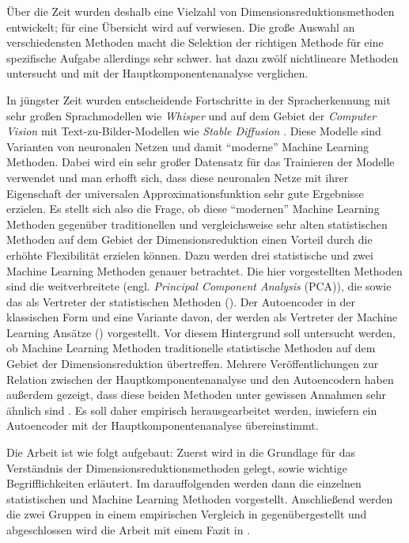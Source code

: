 Über die Zeit wurden deshalb eine Vielzahl von Dimensionsreduktionsmethoden entwickelt; für eine Übersicht wird auf \textcites{Burges.2009}{Sarveniazi.2014}{Sorzano.2014}{Cunningham.2014}{Lee.2007} verwiesen. Die große Auswahl an verschiedensten Methoden macht die Selektion der richtigen Methode für eine spezifische Aufgabe allerdings sehr schwer. \Textcite{vanderMaaten.2009} hat dazu zwölf nichtlineare Methoden untersucht und mit der Hauptkomponentenanalyse verglichen.

In jüngster Zeit wurden entscheidende Fortschritte in der Spracherkennung mit sehr großen
Sprachmodellen wie \textit{Whisper} \parencite{Radford.2022} und auf dem Gebiet der \textit{Computer Vision} mit Text-zu-Bilder-Modellen
wie \textit{Stable Diffusion} \parencite{Rombach.2021}. Diese Modelle sind Varianten von neuronalen Netzen und damit
\enquote{moderne} Machine Learning Methoden. Dabei wird ein sehr großer Datensatz für das
Trainieren der Modelle verwendet und man erhofft sich, dass diese neuronalen Netze mit ihrer
Eigenschaft der universalen Approximationsfunktion \parencites[194 -- 197]{Goodfellow.2016}{Hornik.1989} sehr gute Ergebnisse erzielen. Es stellt sich
also die Frage, ob diese \enquote{modernen} Machine Learning Methoden gegenüber traditionellen und
vergleichsweise sehr alten statistischen Methoden auf dem Gebiet der Dimensionsreduktion einen
Vorteil durch die erhöhte Flexibilität erzielen können. Dazu werden drei statistische und zwei
Machine Learning Methoden genauer betrachtet. Die hier vorgestellten Methoden sind die
weitverbreitete  (engl. \textit{Principal Component Analysis}
(PCA)), die  sowie das  als Vertreter der
statistischen Methoden (). Der Autoencoder in der
klassischen Form und eine Variante davon, der  werden als
Vertreter der Machine Learning Ansätze () vorgestellt. Vor
diesem Hintergrund soll untersucht werden, ob Machine Learning Methoden traditionelle statistische
Methoden auf dem Gebiet der Dimensionsreduktion übertreffen. Mehrere Veröffentlichungen zur
Relation zwischen der Hauptkomponentenanalyse und den Autoencodern haben außerdem gezeigt, dass
diese beiden Methoden unter gewissen Annahmen sehr ähnlich sind \parencites{Baldi.1989}{Bourlard.1988}{Plaut.2018}. Es soll daher empirisch herausgearbeitet werden,
inwiefern ein Autoencoder mit der Hauptkomponentenanalyse übereinstimmt.

Die Arbeit ist wie folgt aufgebaut: Zuerst wird in  die Grundlage
für das Verständnis der Dimensionsreduktionsmethoden gelegt, sowie wichtige Begrifflichkeiten
erläutert. Im darauffolgenden  werden dann die einzelnen
statistischen und Machine Learning Methoden vorgestellt. Anschließend werden die zwei Gruppen in
einem empirischen Vergleich in  gegenübergestellt und abgeschlossen wird die
Arbeit mit einem Fazit in .